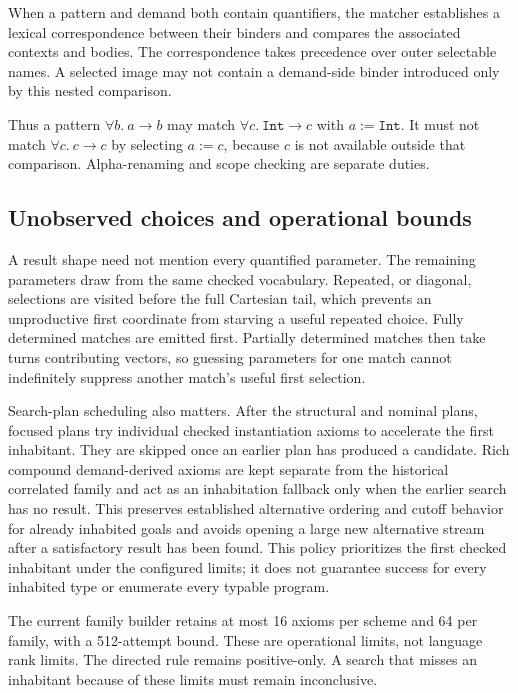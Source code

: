 \documentclass[11pt]{article}
\newcommand{\code}[1]{\texttt{#1}}
\begin{document}
When a pattern and demand both contain quantifiers, the matcher establishes a
lexical correspondence between their binders and compares the associated
contexts and bodies. The correspondence takes precedence over outer
selectable names. A selected image may not contain a demand-side binder
introduced only by this nested comparison.

Thus a pattern $\forall b.\ a\to b$ may match
$\forall c.\ \code{Int}\to c$ with $a:=\code{Int}$. It must not match
$\forall c.\ c\to c$ by selecting $a:=c$, because $c$ is not available outside
that comparison. Alpha-renaming and scope checking are separate duties.

\subsection{Unobserved choices and operational bounds}

A result shape need not mention every quantified parameter. The remaining
parameters draw from the same checked vocabulary. Repeated, or diagonal,
selections are visited before the full Cartesian tail, which prevents an
unproductive first coordinate from starving a useful repeated choice.
Fully determined matches are emitted first. Partially determined matches
then take turns contributing vectors, so guessing parameters for one match
cannot indefinitely suppress another match's useful first selection.

Search-plan scheduling also matters. After the structural and nominal plans,
focused plans try individual checked instantiation axioms to accelerate the
first inhabitant. They are skipped once an earlier plan has produced a
candidate. Rich compound demand-derived axioms are kept separate from the
historical correlated family and act as an inhabitation fallback only when
the earlier search has no result. This preserves established alternative
ordering and cutoff behavior for already inhabited goals and avoids opening
a large new alternative stream after a satisfactory result has been found.
This policy prioritizes the first checked inhabitant under the configured
limits; it does not guarantee success for every inhabited type or enumerate
every typable program.

The current family builder retains at most 16 axioms per scheme and 64 per
family, with a 512-attempt bound. These are operational limits, not language
rank limits. The directed rule remains positive-only. A search that misses an
inhabitant because of these limits must remain inconclusive.
\end{document}
